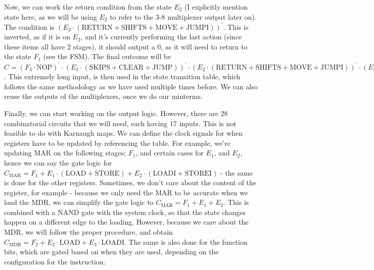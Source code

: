 \documentclass[a4paper, 12pt]{article}
\begin{document}
            Now, we can work the return condition from the state $E_2$ (I explicitly mention state here, as we will be using $E_2$ to refer to the 3-8 multiplexer output later on). The condition is $(E_2 \cdot (\text{RETURN} + \text{SHIFTS} + \text{MOVE} + \text{JUMPI}))^\prime$. This is inverted, as if it is on $E_2$, and it's currently performing the last action (since these items all have 2 stages), it should output a 0, as it will need to return to the state $F_1$ (see the FSM). The final outcome will be $C = (F_3 \cdot \text{NOP})^\prime \cdot (E_1 \cdot (\text{SKIPS} + \text{CLEAR} + \text{JUMP}))^\prime \cdot (E_2 \cdot (\text{RETURN} + \text{SHIFTS} + \text{MOVE} + \text{JUMPI}))^\prime \cdot (E_3 \cdot (\text{COMP} + \text{DEC} + \text{INC} + \text{COMPARE} + \text{ADDS} + \text{STOREI} + \text{LOAD}))^\prime$. This extremely long input, is then used in the state transition table, which follows the same methodology as we have used multiple times before. We can also reuse the outputs of the multiplexers, once we do our minterms.
            \medskip

            Finally, we can start working on the output logic. However, there are 28 combinatorial circuits that we will need, each having 17 inputs. This is not feasible to do with Karnaugh maps. We can define the clock signals for when registers have to be updated by referencing the table. For example, we're updating MAR on the following stages; $F_1$, and certain cases for $E_1$, and $E_2$, hence we can say the gate logic for $C_\text{MAR} = F_1 + E_1 \cdot (\text{LOAD} + \text{STORE}) + E_2 \cdot (\text{LOADI} + \text{STOREI})$ - the same is done for the other registers. Sometimes, we don't care about the content of the register, for example - because we only need the MAR to be accurate when we load the MDR, we can simplify the gate logic to $C_\text{MAR}=F_1 + E_1 + E_2$. This is combined with a NAND gate with the system clock, so that the state changes happen on a different edge to the loading. However, because we care about the MDR, we will follow the proper procedure, and obtain $C_\text{MDR} = F_2 + E_2 \cdot \text{LOAD} + E_3 \cdot \text{LOADI}$. The same is also done for the function bits, which are gated based on when they are used, depending on the configuration for the instruction.
\end{document}
